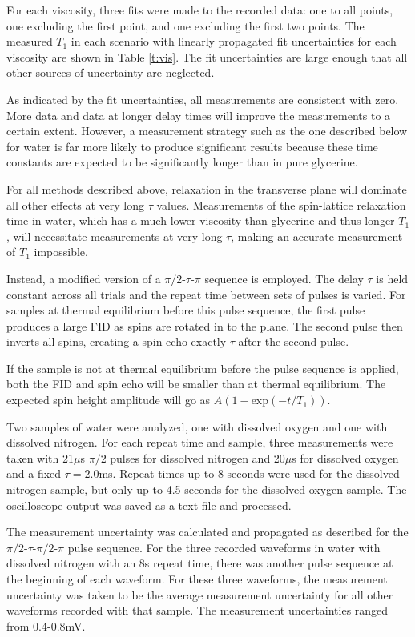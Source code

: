 For each viscosity, three fits were made to the recorded data: one to all points, one excluding the first point, and one excluding the first two points. The measured $T_{1}$ in each scenario with linearly propagated fit uncertainties for each viscosity are shown in Table \ref{t:vis}. The fit uncertainties are large enough that all other sources of uncertainty are neglected.

As indicated by the fit uncertainties, all measurements are consistent with zero. More data and data at longer delay times will improve the measurements to a certain extent. However, a measurement strategy such as the one described below for water is far more likely to produce significant results because these time constants are expected to be significantly longer than in pure glycerine.

For all methods described above, relaxation in the transverse plane will dominate all other effects at very long $\tau$ values. Measurements of the spin-lattice relaxation time in water, which has a much lower viscosity than glycerine and thus longer $T_1$, will necessitate measurements at very long $\tau$, making an accurate measurement of $T_{1}$ impossible. 

Instead, a modified version of a $\pi/2$-$\tau$-$\pi$ sequence is employed. The delay $\tau$ is held constant across all trials and the repeat time between sets of pulses is varied. For samples at thermal equilibrium before this pulse sequence, the first pulse produces a large FID as spins are rotated in to the plane. The second pulse then inverts all spins, creating a spin echo exactly $\tau$ after the second pulse. 

If the sample is not at thermal equilibrium before the pulse sequence is applied, both the FID and spin echo will be smaller than at thermal equilibrium. The expected spin height amplitude will go as $A(1-\mathrm{exp}(-t/T_{1}))$.

Two samples of water were analyzed, one with dissolved oxygen and one with dissolved nitrogen. For each repeat time and sample, three measurements were taken with 21$\mu$s $\pi/2$ pulses for dissolved nitrogen and 20$\mu$s for dissolved oxygen and a fixed $\tau = 2.0$ms. Repeat times up to 8 seconds were used for the dissolved nitrogen sample, but only up to 4.5 seconds for the dissolved oxygen sample. The oscilloscope output was saved as a text file and processed. 

The measurement uncertainty was calculated and propagated as described for the $\pi/2$-$\tau$-$\pi/2$-$\pi$ pulse sequence. For the three recorded waveforms in water with dissolved nitrogen with an 8s repeat time, there was another pulse sequence at the beginning of each waveform. For these three waveforms, the measurement uncertainty was taken to be the average measurement uncertainty for all other waveforms recorded with that sample. The measurement uncertainties ranged from 0.4-0.8mV. 

